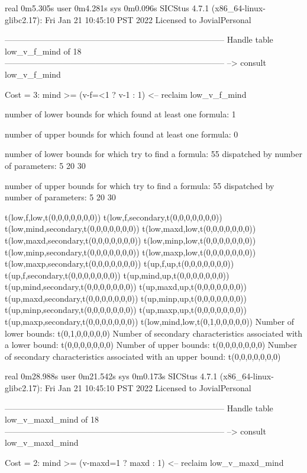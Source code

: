 real	0m5.305s
user	0m4.281s
sys	0m0.096s
SICStus 4.7.1 (x86_64-linux-glibc2.17): Fri Jan 21 10:45:10 PST 2022
Licensed to JovialPersonal


--------------------------------------------------------------------------------
Handle table low_v_f_mind of 18
--------------------------------------------------------------------------------
--> consult low_v_f_mind

Cost =  3:  mind >= (v-f=<1 ? v-1 : 1)
<-- reclaim low_v_f_mind

number of lower bounds for which found at least one formula: 1

number of upper bounds for which found at least one formula: 0

number of lower bounds for which try to find a formula: 55
dispatched by number of parameters: 5  20  30

number of upper bounds for which try to find a formula: 55
dispatched by number of parameters: 5  20  30

t(low,f,low,t(0,0,0,0,0,0,0))
t(low,f,secondary,t(0,0,0,0,0,0,0))
t(low,mind,secondary,t(0,0,0,0,0,0,0))
t(low,maxd,low,t(0,0,0,0,0,0,0))
t(low,maxd,secondary,t(0,0,0,0,0,0,0))
t(low,minp,low,t(0,0,0,0,0,0,0))
t(low,minp,secondary,t(0,0,0,0,0,0,0))
t(low,maxp,low,t(0,0,0,0,0,0,0))
t(low,maxp,secondary,t(0,0,0,0,0,0,0))
t(up,f,up,t(0,0,0,0,0,0,0))
t(up,f,secondary,t(0,0,0,0,0,0,0))
t(up,mind,up,t(0,0,0,0,0,0,0))
t(up,mind,secondary,t(0,0,0,0,0,0,0))
t(up,maxd,up,t(0,0,0,0,0,0,0))
t(up,maxd,secondary,t(0,0,0,0,0,0,0))
t(up,minp,up,t(0,0,0,0,0,0,0))
t(up,minp,secondary,t(0,0,0,0,0,0,0))
t(up,maxp,up,t(0,0,0,0,0,0,0))
t(up,maxp,secondary,t(0,0,0,0,0,0,0))
t(low,mind,low,t(0,1,0,0,0,0,0))
Number of lower bounds:                                             t(0,1,0,0,0,0,0)
Number of secondary characteristics associated with a lower bound:  t(0,0,0,0,0,0,0)
Number of upper bounds:                                             t(0,0,0,0,0,0,0)
Number of secondary characteristics associated with an upper bound: t(0,0,0,0,0,0,0)

real	0m28.988s
user	0m21.542s
sys	0m0.173s
SICStus 4.7.1 (x86_64-linux-glibc2.17): Fri Jan 21 10:45:10 PST 2022
Licensed to JovialPersonal


--------------------------------------------------------------------------------
Handle table low_v_maxd_mind of 18
--------------------------------------------------------------------------------
--> consult low_v_maxd_mind

Cost =  2:  mind >= (v-maxd=1 ? maxd : 1)
<-- reclaim low_v_maxd_mind

